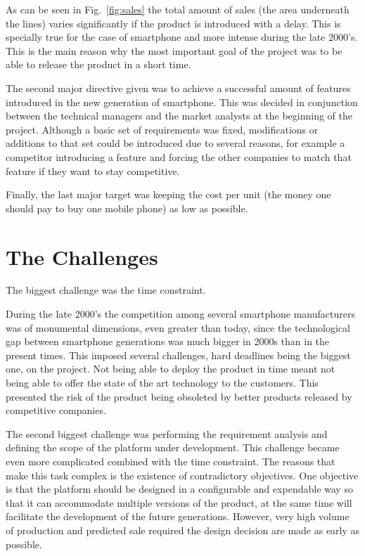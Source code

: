 \documentclass[journal]{IEEEtran}
\begin{document}
As can be seen in Fig.~\ref{fig:sales} the total amount of sales (the area underneath the lines) varies significantly if the product is introduced with a delay. This is specially true for the case of smartphone and more intense during the late 2000's. This is the main reason why the most important goal of the project was to be able to release the product in a short time.

The second major directive given was to achieve a successful amount of features introduced in the new generation of smartphone. This was decided in conjunction between the technical managers and the market analysts at the beginning of the project. Although a basic set of requirements was fixed, modifications or additions to that set could be introduced due to several reasons, for example a competitor introducing a feature and forcing the other companies to match that feature if they want to stay competitive.

Finally, the last major target was keeping the cost per unit (the money one should pay to buy one mobile phone) as low as possible. 

\section{The Challenges}
The biggest challenge was the time constraint. 

During the late 2000's the competition among several smartphone manufacturers was of monumental dimensions, even greater than today, since the technological gap between smartphone generations was much bigger in 2000s than in the present times. This imposed several challenges, hard deadlines being the biggest one, on the project. Not being able to deploy the product in time meant not being able to offer the state of the art technology to the customers. This presented the risk of the product being obsoleted by better products released by competitive companies.

The second biggest challenge was performing the requirement analysis and defining the scope of the platform under development. This challenge became even more complicated combined with the time constraint. The reasons that make this task complex is the existence of contradictory objectives. One objective is that the platform should be designed in a configurable and expendable way so that it can accommodate multiple versions of the product, at the same time will facilitate the development of the future generations. However, very high volume of production and predicted sale required the design decision are made as early as possible.
\end{document}
